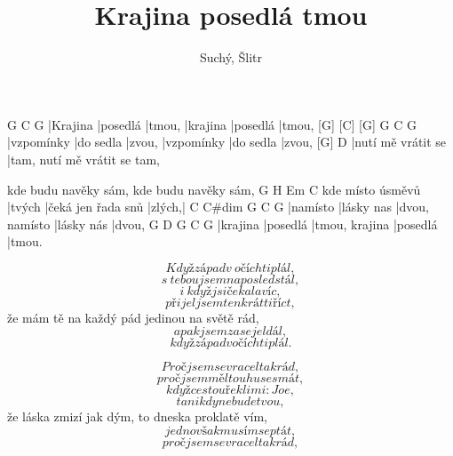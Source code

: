 \documentclass{song}
\title{Krajina posedlá tmou}
\author{Suchý, Šlitr}
\begin{document}
\strophe
[G]     [C]      [G]      G        C        G
|Krajina |posedlá |tmou, |krajina |posedlá |tmou,
[G]       [C]        [G]     G          C         G
|vzpomínky |do sedla |zvou, |vzpomínky |do sedla |zvou,
[G]                D
|nutí mě vrátit se |tam, nutí mě vrátit se tam,

kde budu navěky sám, kde budu navěky sám,
                 G      H\7                Em     C
kde místo úsměvů |tvých |čeká jen řada snů |zlých,|
C        C\#dim     G              C          G
|namísto |lásky nas |dvou, namísto |lásky nás |dvou,
G        D\7      G              C        G
|krajina |posedlá |tmou, krajina |posedlá |tmou.
\endstrophe

\strophe*
\[ Když západ v~očích ti plál, \]
\[ s~tebou jsem naposled stál, \]
\[ i~když jsi čekala víc, \]
\[ přijel jsem tenkrát ti říct, \]
že mám tě na každý pád jedinou na světě rád,
\[ a pak jsem zase jel dál, \]
\[ když západ v očích ti plál. \]
\endstrophe

\strophe*
\[ Proč jsem se vracel tak rád, \]
\[ proč jsem měl touhu se smát, \]
\[ když cestou řekli mi: Joe, \]
\[ ta nikdy nebude tvou, \]
že láska zmizí jak dým, to dneska proklatě vím,
\[ jedno však musím se ptát, \]
\[ proč jsem se vracel tak rád, \]
\endstrophe
\end{document}
